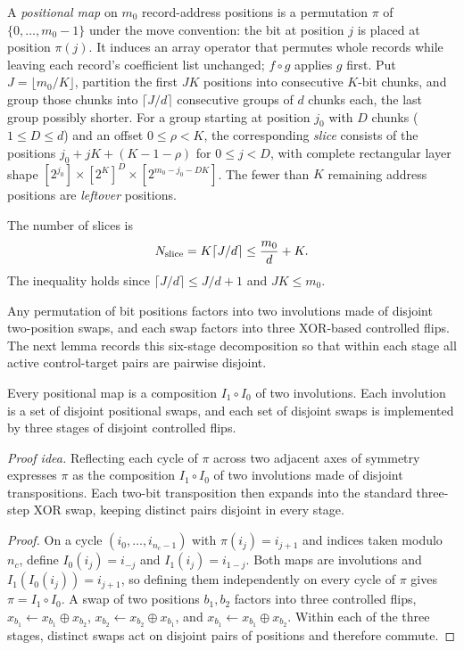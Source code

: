\begin{definition}\label{def:walsh-positional}
A \emph{positional map} on $m_0$ record-address positions is a permutation $\pi$ of $\{0,\dots,m_0-1\}$ under the move
convention: the bit at position $j$ is placed at position $\pi(j)$. It induces an array operator that permutes whole
records while leaving each record's coefficient list unchanged; $f\circ g$ applies $g$ first. Put
$J=\lfloor m_0/K\rfloor$, partition the first $JK$ positions into consecutive $K$-bit chunks, and group those chunks
into $\lceil J/d\rceil$ consecutive groups of $d$ chunks each, the last group possibly shorter. For a group starting at position $j_0$ with $D$ chunks ($1\le D\le d$)
and an offset $0\le\rho<K$, the corresponding \emph{slice} consists of the positions $j_0+jK+(K-1-\rho)$ for
$0\le j<D$, with complete rectangular layer shape $[2^{j_0}]\times[2^K]^D\times[2^{m_0-j_0-DK}]$. The fewer than $K$
remaining address positions are \emph{leftover} positions.
\end{definition}

The number of slices is
\begin{equation}\label{eq:walsh-slices}
  N_{\rm slice}=K\lceil J/d\rceil\le \frac{m_0}{d}+K .
\end{equation}
The inequality holds since $\lceil J/d\rceil\le J/d+1$ and $JK\le m_0$.

Any permutation of bit positions factors into two involutions made of disjoint two-position swaps, and each swap factors
into three XOR-based controlled flips. The next lemma records this six-stage decomposition so that within each stage all
active control-target pairs are pairwise disjoint.

\begin{lemma}\label{lem:walsh-involutions}
Every positional map is a composition $I_1\circ I_0$ of two involutions. Each involution is a set of disjoint
positional swaps, and each set of disjoint swaps is implemented by three stages of disjoint controlled flips.
\end{lemma}

\emph{Proof idea.} Reflecting each cycle of $\pi$ across two adjacent axes of symmetry expresses $\pi$ as the
composition $I_1\circ I_0$ of two involutions made of disjoint transpositions. Each two-bit transposition then expands
into the standard three-step XOR swap, keeping distinct pairs disjoint in every stage.

\begin{proof}
On a cycle $(i_0,\dots,i_{n_c-1})$ with $\pi(i_j)=i_{j+1}$ and indices taken modulo~$n_c$, define $I_0(i_j)=i_{-j}$ and
$I_1(i_j)=i_{1-j}$. Both maps are involutions and $I_1(I_0(i_j))=i_{j+1}$, so defining them independently on every cycle
of $\pi$ gives $\pi=I_1\circ I_0$. A swap of two positions $b_1,b_2$ factors into three controlled flips,
$x_{b_1}\leftarrow x_{b_1}\oplus x_{b_2}$, $x_{b_2}\leftarrow x_{b_2}\oplus x_{b_1}$, and
$x_{b_1}\leftarrow x_{b_1}\oplus x_{b_2}$. Within each of the three stages, distinct swaps act on disjoint pairs of
positions and therefore commute.
\end{proof}

